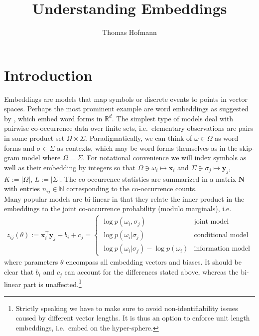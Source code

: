 \documentclass{article}
\title{Understanding Embeddings}
\author{Thomas Hofmann}
\renewcommand{\Re}{{\mathbb R}}
\newcommand{\NN}{{\mathbb N}}
\newcommand{\x}{{\mathbf x}}
\newcommand{\y}{{\mathbf y}}
\newcommand{\word}{{\omega}}
\newcommand{\words}{{\Omega}}
\newcommand{\context}{{\sigma}}
\newcommand{\contexts}{{\Sigma}}
\newcommand{\mN}{{\mathbf N}}
\begin{document}
\maketitle

\section{Introduction}

Embeddings are models that map symbols or discrete events to points in vector spaces. Perhaps the most prominent example are word embeddings as suggested by \cite{mikolov2013distributed,pennington2014glove}, which embed word forms in $\Re^d$. The simplest type of models deal with pairwise co-occurrence data over finite sets, i.e.~elementary observations are pairs in some product set $\words \times \contexts$. Paradigmatically, we can think of $\word \in \words$ as word forms and $\context \in \contexts$ as contexts, which may be word forms themselves as in the skip-gram model \cite{mikolov2013distributed} where $\words=\contexts$. For notational convenience we will index symbols as well as their embedding by integers so that $\words \ni \word_i  \mapsto \x_i$ and $\contexts \ni \context_j \mapsto \y_j$, $K:=|\words|$, $L:=|\contexts|$. The co-occurrence statistics are summarized in a matrix $\mN$ with entries $n_{ij} \in \NN$ corresponding to the co-occurrence counts. \\

Many popular models are bi-linear in that they relate 	the inner product in the embeddings to the joint co-occurrence probability (modulo marginals), i.e.~
\begin{align}
z_{ij}(\theta) := \x_i^\top \y_j + b_i + c_j = \begin{cases} 
\log p(\word_i,  \context_j) & \text{joint model} \\
\log p(\word_i | \context_j) & \text{conditional model} \\
\log p(\word_i | \context_j) - \log p(\word_i) & \text{information model}
 \end{cases}
\end{align} 
where parameters $\theta$ encompass all embedding vectors and biases. 
It should be clear that $b_i$ and $c_j$ can account for the differences stated above, whereas the bi-linear part is unaffected.\footnote{Strictly speaking we have to make sure to avoid non-identifiability issues caused by different vector lengths. It is thus an option to enforce unit length embeddings, i.e.~embed on the hyper-sphere.}
\end{document}
